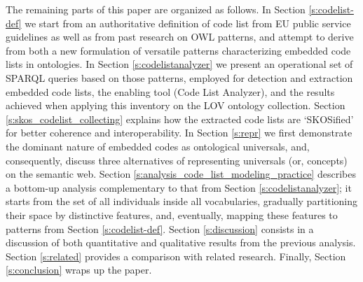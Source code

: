 The remaining parts of this paper are organized as follows. 
In Section \ref{s:codelist-def} we start from an authoritative definition of code list from EU public service guidelines as well as from past research on OWL patterns, and attempt to derive from both a new formulation of versatile patterns characterizing embedded code lists in ontologies. 
In Section \ref{s:codelistanalyzer} we present an operational set of SPARQL queries based on those patterns, employed for detection and extraction embedded code lists, the enabling tool (Code List Analyzer), and the results achieved when applying this inventory on the LOV ontology collection.
Section \ref{s:skos_codelist_collecting} explains how the extracted code lists are `SKOSified' for better coherence and interoperability.
In Section \ref{s:repr} we first demonstrate the dominant nature of embedded codes as ontological universals, and, consequently, discuss three alternatives of representing universals (or, concepts) on the semantic web.
Section \ref{s:analysis_code_list_modeling_practice} describes a bottom-up analysis complementary to that from Section \ref{s:codelistanalyzer}; it starts from the set of all individuals inside all vocabularies, gradually partitioning their space by distinctive features, and, eventually, mapping these features to patterns from Section \ref{s:codelist-def}.
Section \ref{s:discussion} consists in a discussion of both quantitative and qualitative results from the previous analysis.
Section \ref{s:related} provides a comparison with related research.
Finally, Section \ref{s:conclusion} wraps up the paper.
